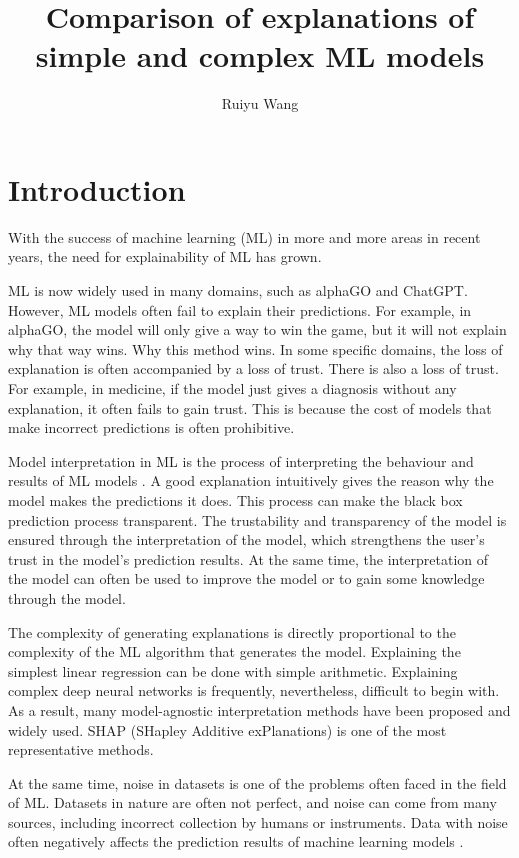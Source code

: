 \documentclass[runningheads,a4paper]{llncs}
\title{Comparison of explanations of simple and complex ML models}
\author{Ruiyu Wang}
\institute{MSc in Advanced Computer Science, \\ School of Computing Science,
        University of Newcastle, U. K. \\
        \email{r.wang57@ncl.ac.uk}
}
\begin{document}
\maketitle

\section{Introduction}

With the success of machine learning (ML) in more and more areas in recent years, the need for explainability of ML has grown.

ML is now widely used in many domains, such as alphaGO and ChatGPT.
However, ML models often fail to explain their predictions. For example,  in alphaGO, the model will only give a way to win the game, but it will not explain why that way wins.
Why this method wins. In some specific domains, the loss of explanation is often accompanied by a loss of trust.
There is also a loss of trust. 
For example, in medicine, if the model just gives a diagnosis without any explanation, it often fails to gain trust. This is because the cost of models that make incorrect predictions is often prohibitive.

Model interpretation in ML is the process of interpreting the behaviour and results of ML models \cite{doshivelez2017rigorous}.
A good explanation intuitively gives the reason why the model makes the predictions it does.
This process can make the black box prediction process transparent.\cite{8466590}
The trustability and transparency of the model is ensured through the interpretation of the model\cite{arrieta2020explainable}\cite{Molnar2020}, which strengthens the user's trust in the model's prediction results.
At the same time, the interpretation of the model can often be used to improve the model or to gain some knowledge through the model.\cite{8466590}

The complexity of generating explanations is directly proportional to the complexity of the ML algorithm that generates the model.
Explaining the simplest linear regression can be done with simple arithmetic. Explaining complex deep neural networks is frequently, nevertheless, difficult to begin with.
As a result, many model-agnostic interpretation methods have been proposed and widely used.
SHAP (SHapley Additive exPlanations)\cite{lundberg2017unified} is one of the most representative methods.

At the same time, noise in datasets is one of the problems often faced in the field of ML.
Datasets in nature are often not perfect, and noise can come from many sources, including incorrect collection by humans or instruments.
Data with noise often negatively affects the prediction results of machine learning models \cite{GUPTA2019466}\cite{saseendran2019impact}.
\end{document}
